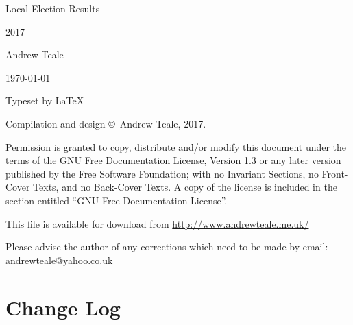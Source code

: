 \documentclass[a4paper,openany]{book}
\begin{document}

\begin{titlepage}

\begin{center}

\Huge Local Election Results

2017

\bigskip

\Large Andrew Teale

\vfill

\newcommand\versionno{0.10.1}


\today

\end{center}

\end{titlepage}


\begin{center}

\bigskip

Typeset by \LaTeX{} 

\bigskip

Compilation and design \copyright\ Andrew Teale, 2017.

 Permission is granted to copy, distribute and/or modify this document
 under the terms of the GNU Free Documentation License, Version 1.3
 or any later version published by the Free Software Foundation;
 with no Invariant Sections, no Front-Cover Texts, and no Back-Cover Texts.
 A copy of the license is included in the section entitled ``GNU
 Free Documentation License''.

\bigskip

This file is available for download from
\url{http://www.andrewteale.me.uk/}

\bigskip

Please advise the author of any corrections which need to be made by
email: \url{andrewteale@yahoo.co.uk}

\vfill
\end{center}

\section*{Change Log}


%
\end{document}
